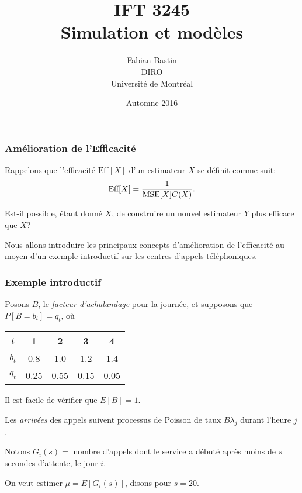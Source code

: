 \documentclass[t,usepdftitle=false]{beamer}
\title[IFT3245]{IFT 3245\\Simulation et modèles}
\author[Fabian Bastin]{Fabian Bastin\\DIRO\\Université de Montréal}
\date{Automne 2016}
\def\MSE{\mbox{MSE}}
\def\eff{\mbox{Eff}}
\def\Var{\mbox{Var}}
\begin{document}
\frame{\titlepage}

\begin{frame}
\frametitle{Amélioration de l'Efficacité}

Rappelons que l'efficacité $\eff[X]$ d'un estimateur $X$ se
définit comme suit:
\[
  \eff[X] = {1\over \MSE[X] C(X)}.
\]

\mbox{}

Est-il possible, étant donné $X$, de construire un nouvel estimateur $Y$ plus efficace que $X$?

\mbox{}

Nous allons introduire les principaux concepts d'amélioration de l'efficacité au moyen d'un exemple introductif sur les centres d'appels téléphoniques.

\end{frame}

\begin{frame}
\frametitle{Exemple introductif}

Posons ${B}$, le \emph{facteur d'achalandage} pour la journée, et
supposons que $P[B = b_t] = q_t$, o\`u
\begin{center}
\begin{tabular}{c|cccc}
 ${t}$   &   1  &  2   &   3  &  4  \\  
\hline
 ${b_t}$ &  0.8 &  1.0 &  1.2 &  1.4 \\
 ${q_t}$ & 0.25 & 0.55 & 0.15 & 0.05 \\
\end{tabular}
\end{center}

\mbox{}

Il est facile de vérifier que $E[B] = 1$. %

\mbox{}

Les \emph{arrivées} des appels suivent processus de Poisson de taux
$B{\lambda_j}$ durant l'heure $j$.

\mbox{}

Notons ${G_i(s)}=$ nombre d'appels dont le service a débuté
après moins de ${s}$ secondes d'attente, le jour $i$.

\mbox{}

On veut estimer ${\mu} = E[G_i(s)]$, disons pour ${s=20}$.

\end{frame}
\end{document}
